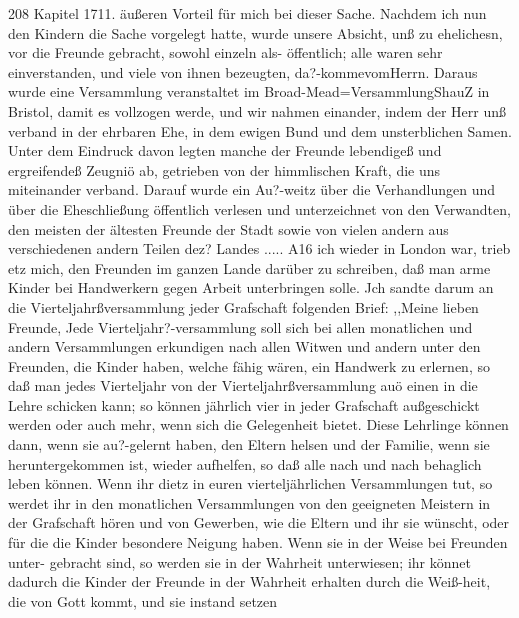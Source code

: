 208 Kapitel 1711.
äußeren Vorteil für mich bei dieser Sache. Nachdem ich nun
den Kindern die Sache vorgelegt hatte, wurde unsere Absicht,
unß zu ehelichesn, vor die Freunde gebracht, sowohl einzeln als-
öffentlich; alle waren sehr einverstanden, und viele von ihnen
bezeugten, da?-kommevomHerrn. Daraus wurde eine Versammlung
veranstaltet im Broad-Mead=VersammlungShauZ in Bristol, damit
es vollzogen werde, und wir nahmen einander, indem der Herr
unß verband in der ehrbaren Ehe, in dem ewigen Bund und
dem unsterblichen Samen. Unter dem Eindruck davon legten
manche der Freunde lebendigeß und ergreifendeß Zeugniö ab,
getrieben von der himmlischen Kraft, die uns miteinander verband.
Darauf wurde ein Au?-weitz über die Verhandlungen und über
die Eheschließung öffentlich verlesen und unterzeichnet von den
Verwandten, den meisten der ältesten Freunde der Stadt sowie
von vielen andern aus verschiedenen andern Teilen dez? Landes .....
A16 ich wieder in London war, trieb etz mich, den Freunden
im ganzen Lande darüber zu schreiben, daß man arme Kinder
bei Handwerkern gegen Arbeit unterbringen solle. Jch sandte
darum an die Vierteljahrßversammlung jeder Grafschaft folgenden
Brief:
,,Meine lieben Freunde,
Jede Vierteljahr?-versammlung soll sich bei allen monatlichen
und andern Versammlungen erkundigen nach allen Witwen und
andern unter den Freunden, die Kinder haben, welche fähig
wären, ein Handwerk zu erlernen, so daß man jedes Vierteljahr
von der Vierteljahrßversammlung auö einen in die Lehre schicken
kann; so können jährlich vier in jeder Grafschaft außgeschickt
werden oder auch mehr, wenn sich die Gelegenheit bietet. Diese
Lehrlinge können dann, wenn sie au?-gelernt haben, den Eltern
helsen und der Familie, wenn sie heruntergekommen ist, wieder
aufhelfen, so daß alle nach und nach behaglich leben können.
Wenn ihr dietz in euren vierteljährlichen Versammlungen tut, so
werdet ihr in den monatlichen Versammlungen von den geeigneten
Meistern in der Grafschaft hören und von Gewerben, wie die
Eltern und ihr sie wünscht, oder für die die Kinder besondere
Neigung haben. Wenn sie in der Weise bei Freunden unter-
gebracht sind, so werden sie in der Wahrheit unterwiesen; ihr
könnet dadurch die Kinder der Freunde in der Wahrheit erhalten
durch die Weiß-heit, die von Gott kommt, und sie instand setzen



